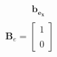 \documentclass[preview]{standalone}
\begin{document}
\begin{align*}
\begin{array}{c}\begin{matrix}\hspace{1cm} \mathbf{b_{e_x}}\end{matrix} \\  \mathbf{B}_e = \begin{bmatrix} 1 \\ \\0  \end{bmatrix} \end{array}
\end{align*}
\end{document}
